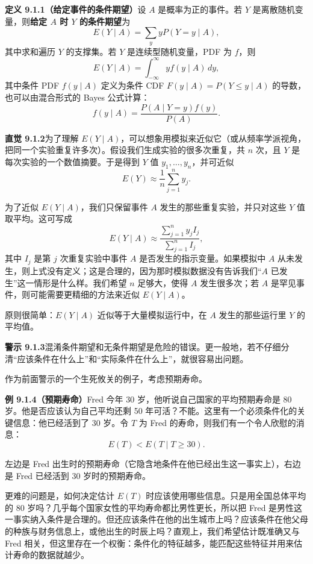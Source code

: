 \documentclass[UTF8,12pt,a4paper,fontset=fandol]{ctexart}
\begin{document}
\noindent\textbf{定义 9.1.1（给定事件的条件期望）}\quad 设 $A$ 是概率为正的事件。若 $Y$ 是离散随机变量，则\textbf{给定 $A$ 时 $Y$ 的条件期望}为
\[
  E(Y\mid A)=\sum_y yP(Y=y\mid A),
\]
其中求和遍历 $Y$ 的支撑集。若 $Y$ 是连续型随机变量，PDF 为 $f$，则
\[
  E(Y\mid A)=\int_{-\infty}^{\infty} y f(y\mid A)\,dy,
\]
其中条件 PDF $f(y\mid A)$ 定义为条件 CDF $F(y\mid A)=P(Y\le y\mid A)$ 的导数，也可以由混合形式的 Bayes 公式计算：
\[
  f(y\mid A)=\frac{P(A\mid Y=y)f(y)}{P(A)}.
\]

\noindent\textbf{直觉 9.1.2}\quad 为了理解 $E(Y\mid A)$，可以想象用模拟来近似它（或从频率学派视角，把同一个实验重复许多次）。假设我们生成实验的很多次重复，共 $n$ 次，且 $Y$ 是每次实验的一个数值摘要。于是得到 $Y$ 值 $y_1,\ldots,y_n$，并可近似
\[
  E(Y)\approx \frac1n\sum_{j=1}^n y_j.
\]

为了近似 $E(Y\mid A)$，我们只保留事件 $A$ 发生的那些重复实验，并只对这些 $Y$ 值取平均。这可写成
\[
  E(Y\mid A)\approx
  \frac{\sum_{j=1}^n y_j I_j}{\sum_{j=1}^n I_j},
\]
其中 $I_j$ 是第 $j$ 次重复实验中事件 $A$ 是否发生的指示变量。如果模拟中 $A$ 从未发生，则上式没有定义；这是合理的，因为那时模拟数据没有告诉我们“$A$ 已发生”这一情形是什么样。我们希望 $n$ 足够大，使得 $A$ 发生很多次；若 $A$ 是罕见事件，则可能需要更精细的方法来近似 $E(Y\mid A)$。

原则很简单：$E(Y\mid A)$ 近似等于大量模拟运行中，在 $A$ 发生的那些运行里 $Y$ 的平均值。

\noindent\textbf{警示 9.1.3}\quad 混淆条件期望和无条件期望是危险的错误。更一般地，若不仔细分清“应该条件在什么上”和“实际条件在什么上”，就很容易出问题。

作为前面警示的一个生死攸关的例子，考虑预期寿命。

\noindent\textbf{例 9.1.4（预期寿命）}\quad Fred 今年 30 岁，他听说自己国家的平均预期寿命是 80 岁。他是否应该认为自己平均还剩 50 年可活？不能。这里有一个必须条件化的关键信息：他已经活到了 30 岁。令 $T$ 为 Fred 的寿命，则我们有一个令人欣慰的消息：
\[
  E(T)<E(T\mid T\ge 30).
\]

左边是 Fred 出生时的预期寿命（它隐含地条件在他已经出生这一事实上），右边是 Fred 已经活到 30 岁时的预期寿命。

更难的问题是，如何决定估计 $E(T)$ 时应该使用哪些信息。只是用全国总体平均的 80 岁吗？几乎每个国家女性的平均寿命都比男性更长，所以把 Fred 是男性这一事实纳入条件是合理的。但还应该条件在他的出生城市上吗？应该条件在他父母的种族与财务信息上，或他出生的时辰上吗？直观上，我们希望估计既准确又与 Fred 相关，但这里存在一个权衡：条件化的特征越多，能匹配这些特征并用来估计寿命的数据就越少。
\end{document}
